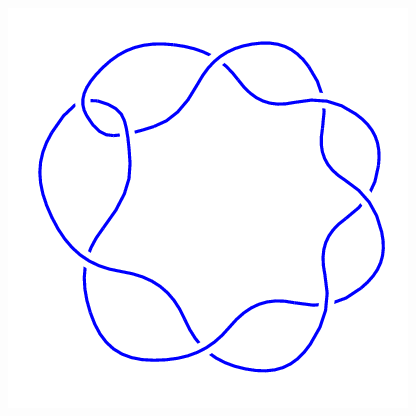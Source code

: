 \begin{figure}[H]
\begin{minipage}[b]{.18\linewidth}
	\end{minipage}
	\begin{minipage}[b]{.18\linewidth}
		\centering
		\includegraphics[width=\linewidth]{../data/8_1.png}
	\end{minipage}
\end{figure}
